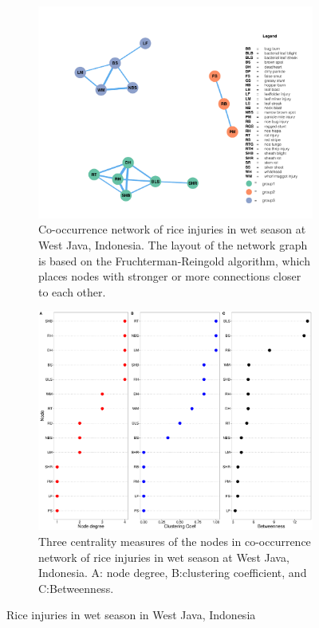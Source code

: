 \begin{figure}
    \centering
    \begin{subfigure}[b]{1\textwidth}
        \includegraphics[width = 1\textwidth]{figures/networkWJ_ws/networkWJ_ws.pdf}
        \caption{Co-occurrence network of rice injuries in wet season at West Java, Indonesia. The layout of the network graph is based on the Fruchterman-Reingold algorithm, which places nodes with stronger or more connections closer to each other.}
        \label{fig:networkWJ_ws}
    \end{subfigure}
    \begin{subfigure}[b]{1\textwidth}
        \includegraphics[width = 1\textwidth]{figures/nodepropWJ_ws/nodepropWJ_ws.pdf}
        \caption{Three centrality measures of the nodes in co-occurrence network of rice injuries in wet season at West Java, Indonesia. A: node degree, B:clustering coefficient, and C:Betweenness.}
        \label{fig:nodepropWJ_ds}    \end{subfigure}    \caption{Rice injuries in wet season in West Java, Indonesia}    \label{fig:WJ_ws}\end{figure}

